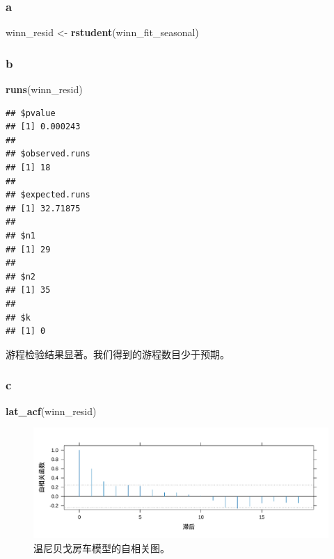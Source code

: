 \documentclass[
]{article}
\newenvironment{Shaded}{\begin{snugshade}}{\end{snugshade}}
\newcommand{\FunctionTok}[1]{\textcolor[rgb]{0.13,0.29,0.53}{\textbf{#1}}}
\newcommand{\NormalTok}[1]{#1}
\newcommand{\OtherTok}[1]{\textcolor[rgb]{0.56,0.35,0.01}{#1}}
\begin{document}
\hypertarget{a-7}{%
\subsubsection*{a}\label{a-7}}

\begin{Shaded}
\begin{Highlighting}[]
\NormalTok{winn\_resid }\OtherTok{\textless{}{-}} \FunctionTok{rstudent}\NormalTok{(winn\_fit\_seasonal)}
\end{Highlighting}
\end{Shaded}

\hypertarget{b-7}{%
\subsubsection*{b}\label{b-7}}

\begin{Shaded}
\begin{Highlighting}[]
\FunctionTok{runs}\NormalTok{(winn\_resid)}
\end{Highlighting}
\end{Shaded}

\begin{verbatim}
## $pvalue
## [1] 0.000243
## 
## $observed.runs
## [1] 18
## 
## $expected.runs
## [1] 32.71875
## 
## $n1
## [1] 29
## 
## $n2
## [1] 35
## 
## $k
## [1] 0
\end{verbatim}

游程检验结果显著。我们得到的游程数目少于预期。

\hypertarget{c-6}{%
\subsubsection*{c}\label{c-6}}

\begin{Shaded}
\begin{Highlighting}[]
\FunctionTok{lat\_acf}\NormalTok{(winn\_resid)}
\end{Highlighting}
\end{Shaded}

\begin{figure}
\centering
\includegraphics{chapter3_files/figure-latex/winn-acf-1.pdf}
\caption{\label{fig:winn-acf}温尼贝戈房车模型的自相关图。}
\end{figure}
\end{document}
